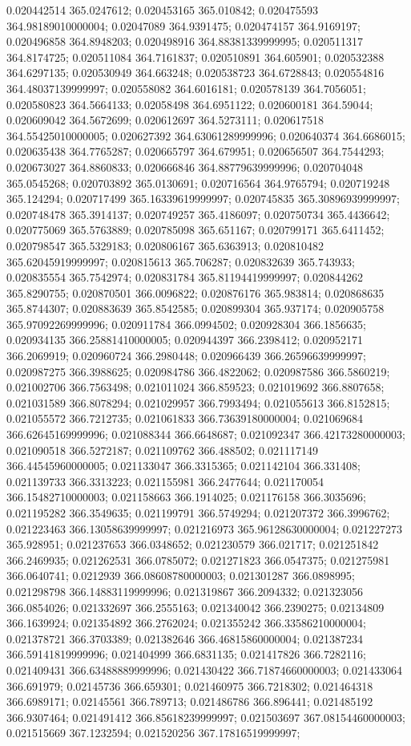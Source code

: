 0.020442514 365.0247612; 0.020453165 365.010842; 0.020475593 364.98189010000004; 0.02047089 364.9391475; 0.020474157 364.9169197; 0.020496858 364.8948203; 0.020498916 364.88381339999995; 0.020511317 364.8174725; 0.020511084 364.7161837; 0.020510891 364.605901; 0.020532388 364.6297135; 0.020530949 364.663248; 0.020538723 364.6728843; 0.020554816 364.48037139999997; 0.020558082 364.6016181; 0.020578139 364.7056051; 0.020580823 364.5664133; 0.02058498 364.6951122; 0.020600181 364.59044; 0.020609042 364.5672699; 0.020612697 364.5273111; 0.020617518 364.55425010000005; 0.020627392 364.63061289999996; 0.020640374 364.6686015; 0.020635438 364.7765287; 0.020665797 364.679951; 0.020656507 364.7544293; 0.020673027 364.8860833; 0.020666846 364.88779639999996; 0.020704048 365.0545268; 0.020703892 365.0130691; 0.020716564 364.9765794; 0.020719248 365.124294; 0.020717499 365.16339619999997; 0.020745835 365.30896939999997; 0.020748478 365.3914137; 0.020749257 365.4186097; 0.020750734 365.4436642; 0.020775069 365.5763889; 0.020785098 365.651167; 0.020799171 365.6411452; 0.020798547 365.5329183; 0.020806167 365.6363913; 0.020810482 365.62045919999997; 0.020815613 365.706287; 0.020832639 365.743933; 0.020835554 365.7542974; 0.020831784 365.81194419999997; 0.020844262 365.8290755; 0.020870501 366.0096822; 0.020876176 365.983814; 0.020868635 365.8744307; 0.020883639 365.8542585; 0.020899304 365.937174; 0.020905758 365.97092269999996; 0.020911784 366.0994502; 0.020928304 366.1856635; 0.020934135 366.25881410000005; 0.020944397 366.2398412; 0.020952171 366.2069919; 0.020960724 366.2980448; 0.020966439 366.26596639999997; 0.020987275 366.3988625; 0.020984786 366.4822062; 0.020987586 366.5860219; 0.021002706 366.7563498; 0.021011024 366.859523; 0.021019692 366.8807658; 0.021031589 366.8078294; 0.021029957 366.7993494; 0.021055613 366.8152815; 0.021055572 366.7212735; 0.021061833 366.73639180000004; 0.021069684 366.62645169999996; 0.021088344 366.6648687; 0.021092347 366.42173280000003; 0.021090518 366.5272187; 0.021109762 366.488502; 0.021117149 366.44545960000005; 0.021133047 366.3315365; 0.021142104 366.331408; 0.021139733 366.3313223; 0.021155981 366.2477644; 0.021170054 366.15482710000003; 0.021158663 366.1914025; 0.021176158 366.3035696; 0.021195282 366.3549635; 0.021199791 366.5749294; 0.021207372 366.3996762; 0.021223463 366.13058639999997; 0.021216973 365.96128630000004; 0.021227273 365.928951; 0.021237653 366.0348652; 0.021230579 366.021717; 0.021251842 366.2469935; 0.021262531 366.0785072; 0.021271823 366.0547375; 0.021275981 366.0640741; 0.0212939 366.08608780000003; 0.021301287 366.0898995; 0.021298798 366.14883119999996; 0.021319867 366.2094332; 0.021323056 366.0854026; 0.021332697 366.2555163; 0.021340042 366.2390275; 0.02134809 366.1639924; 0.021354892 366.2762024; 0.021355242 366.33586210000004; 0.021378721 366.3703389; 0.021382646 366.46815860000004; 0.021387234 366.59141819999996; 0.021404999 366.6831135; 0.021417826 366.7282116; 0.021409431 366.63488889999996; 0.021430422 366.71874660000003; 0.021433064 366.691979; 0.02145736 366.659301; 0.021460975 366.7218302; 0.021464318 366.6989171; 0.02145561 366.789713; 0.021486786 366.896441; 0.021485192 366.9307464; 0.021491412 366.85618239999997; 0.021503697 367.08154460000003; 0.021515669 367.1232594; 0.021520256 367.17816519999997; 